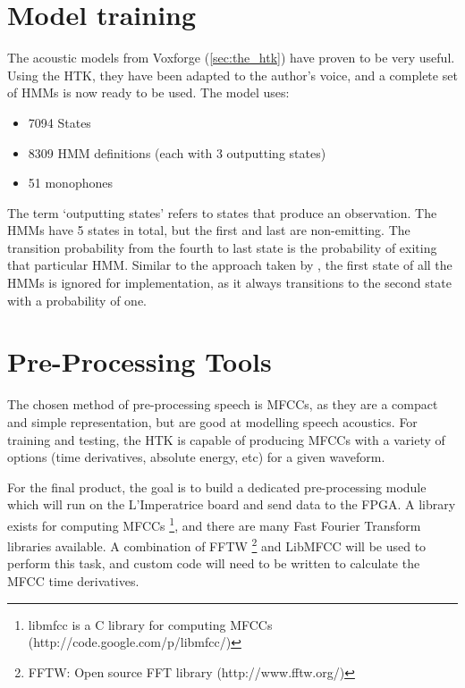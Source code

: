 \section{Model training} %
\label{sec:model_training}
The acoustic models from Voxforge (\ref{sec:the_htk}) have proven to be very useful.  Using the HTK, they have been adapted to the author's voice, and a complete set of HMMs is now ready to be used.  The model uses:
\begin{itemize}
	\item 7094 States
	\item 8309 HMM definitions (each with 3 outputting states)
	\item 51 monophones
\end{itemize}
The term `outputting states' refers to states that produce an observation.  The HMMs have 5 states in total, but the first and last are non-emitting.  The transition probability from the fourth to last state is the probability of exiting that particular HMM.  Similar to the approach taken by \cite{melnikoff2003speech}, the first state of all the HMMs is ignored for implementation, as it always transitions to the second state with a probability of one.

\section{Pre-Processing Tools} %
\label{sec:pre_processing_tools}
The chosen method of pre-processing speech is MFCCs, as they are a compact and simple representation, but are good at modelling speech acoustics.  For training and testing, the HTK is capable of producing MFCCs with a variety of options (time derivatives, absolute energy, etc) for a given waveform.

For the final product, the goal is to build a dedicated pre-processing module which will run on the L'Imperatrice board and send data to the FPGA.  A library exists for computing MFCCs \footnote{libmfcc is a C library for computing MFCCs (http://code.google.com/p/libmfcc/)}, and there are many Fast Fourier Transform libraries available.  A combination of FFTW \footnote{FFTW: Open source FFT library (http://www.fftw.org/)} and LibMFCC will be used to perform this task, and custom code will need to be written to calculate the MFCC time derivatives.

